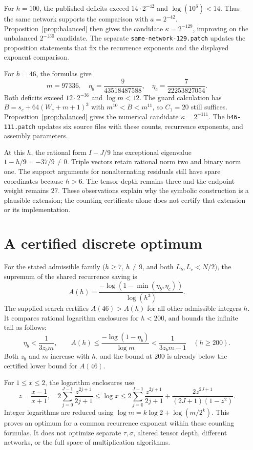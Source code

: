 \documentclass[11pt]{article}
\begin{document}
For $h=100$, the published deficits exceed $14\cdot2^{-42}$ and
$\log(10^6)<14$. Thus the same network supports the comparison with
$a=2^{-42}$. Proposition~\ref{prop:balanced} then gives the candidate
$\kappa=2^{-129}$, improving on the unbalanced $2^{-130}$ candidate.
The separate \texttt{same-network-129.patch} updates the proposition statements
that fix the recurrence exponents and the displayed exponent comparison.

For $h=46$, the formulas give
\[
 m=97336,\quad \eta_b=\frac9{43518487588},\quad
 \eta_c=\frac7{22253827054}.
\]
Both deficits exceed $12\cdot2^{-36}$ and $\log m<12$.
The guard calculation has
$B=s_c+64(W_c+m+1)^3$ with $m^{10}<B<m^{11}$, so $C_1=20$
still suffices. Proposition~\ref{prop:balanced} gives the numerical
candidate $\kappa=2^{-111}$. The \texttt{h46-111.patch} updates six source
files with these counts, recurrence exponents, and assembly parameters.

At this $h$, the rational form $I-J/9$ has exceptional eigenvalue
$1-h/9=-37/9\ne0$. Triple vectors retain rational norm two and
binary norm one. The support arguments for nonalternating residuals
still have spare coordinates because $h>6$. The tensor depth remains
three and the endpoint weight remains $27$. These observations explain
why the symbolic construction is a plausible extension; the counting
certificate alone does not certify that extension or its implementation.

\section{A certified discrete optimum}
For the stated admissible family ($h\ge7$, $h\ne9$, and both
$L_b,L_c<N/2$), the supremum of the shared recurrence saving is
\[
 A(h)=\frac{-\log(1-\min(\eta_b,\eta_c))}{\log(h^3)}.
\]
The supplied search certifies $A(46)>A(h)$ for all other admissible
integers $h$. It compares rational logarithm enclosures for $h<200$,
and bounds the infinite tail as follows:
\[
 \eta_b<\frac1{3z_bm},\qquad
 A(h)\le\frac{-\log(1-\eta_b)}{\log m}
 <\frac1{3z_bm-1}\quad(h\ge200).
\]
Both $z_b$ and $m$ increase with $h$, and the bound at $200$ is already
below the certified lower bound for $A(46)$.

For $1\le x\le2$, the logarithm enclosures use
\[
 z=\frac{x-1}{x+1},\quad
 2\sum_{j=0}^{J-1}\frac{z^{2j+1}}{2j+1}
 \le\log x\le
 2\sum_{j=0}^{J-1}\frac{z^{2j+1}}{2j+1}
 +\frac{2z^{2J+1}}{(2J+1)(1-z^2)}.
\]
Integer logarithms are reduced using
$\log m=k\log2+\log(m/2^k)$.
This proves an optimum for a common recurrence exponent within these
counting formulas. It does not optimize separate $\tau,\sigma$, altered
tensor depth, different networks, or the full space of multiplication algorithms.
\end{document}
